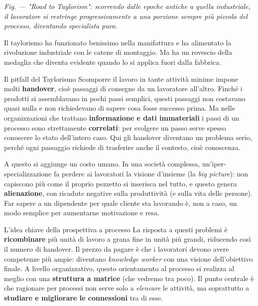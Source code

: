 \emph{Fig. — "Road to Taylorism": scorrendo dalle epoche antiche a quella industriale, il lavoratore si restringe progressivamente a una porzione sempre più piccola del processo, diventando specialista puro.}

Il taylorismo ha funzionato benissimo nella manifattura e ha alimentato la rivoluzione industriale con le catene di montaggio. Ma ha un rovescio della medaglia che diventa evidente quando lo si applica fuori dalla fabbrica.

\begin{boxwarning}{Il pitfall del Taylorismo}
Scomporre il lavoro in tante attività minime impone molti \textbf{handover}, cioè passaggi di consegne da un lavoratore all'altro. Finché i prodotti si assemblavano in pochi passi semplici, questi passaggi non costavano quasi nulla e non richiedevano di sapere cosa fosse successo prima. Ma nelle organizzazioni che trattano \textbf{informazione e dati immateriali} i passi di un processo sono strettamente \textbf{correlati}: per svolgere un passo serve spesso conoscere lo stato dell'intero caso. Qui gli handover diventano un problema serio, perché ogni passaggio richiede di trasferire anche il contesto, cioè conoscenza.
\end{boxwarning}

A questo si aggiunge un costo umano. In una società complessa, un'iper-specializzazione fa perdere ai lavoratori la visione d'insieme (la \emph{big picture}): non capiscono più come il proprio pezzetto si inserisca nel tutto, e questo genera \textbf{alienazione}, con ricadute negative sulla produttività (e sulla vita delle persone). Far sapere a un dipendente per quale cliente sta lavorando è, non a caso, un modo semplice per aumentarne motivazione e resa.

\begin{boxtip}{L'idea chiave della prospettiva a processo}
La risposta a questi problemi è \textbf{ricombinare} più unità di lavoro a grana fine in unità più grandi, riducendo così il numero di handover. Il prezzo da pagare è che i lavoratori devono avere competenze più ampie: diventano \emph{knowledge worker} con una visione dell'obiettivo finale. A livello organizzativo, questo orientamento al processo si realizza al meglio con una \textbf{struttura a matrice} (che vedremo tra poco). Il punto centrale è che ragionare per processi non serve solo a \emph{elencare} le attività, ma soprattutto a \textbf{studiare e migliorare le connessioni} tra di esse.
\end{boxtip}

